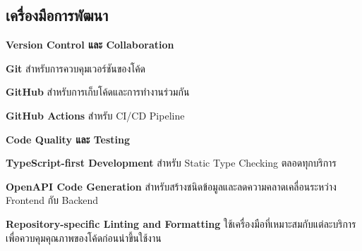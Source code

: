 \subsection{เครื่องมือการพัฒนา}

\hspace*{1.3em} %
\textbf{Version Control และ Collaboration}
\begin{mycustomitem}
    \item \textbf{Git} สำหรับการควบคุมเวอร์ชันของโค้ด
    \item \textbf{GitHub} สำหรับการเก็บโค้ดและการทำงานร่วมกัน
    \item \textbf{GitHub Actions} สำหรับ CI/CD Pipeline
\end{mycustomitem}

\hspace*{1.3em} %
\textbf{Code Quality และ Testing}
\begin{mycustomitem}
    \item \textbf{TypeScript-first Development} สำหรับ Static Type Checking ตลอดทุกบริการ
    \item \textbf{OpenAPI Code Generation} สำหรับสร้างชนิดข้อมูลและลดความคลาดเคลื่อนระหว่าง Frontend กับ Backend
    \item \textbf{Repository-specific Linting and Formatting} ใช้เครื่องมือที่เหมาะสมกับแต่ละบริการเพื่อควบคุมคุณภาพของโค้ดก่อนนำขึ้นใช้งาน
\end{mycustomitem}
